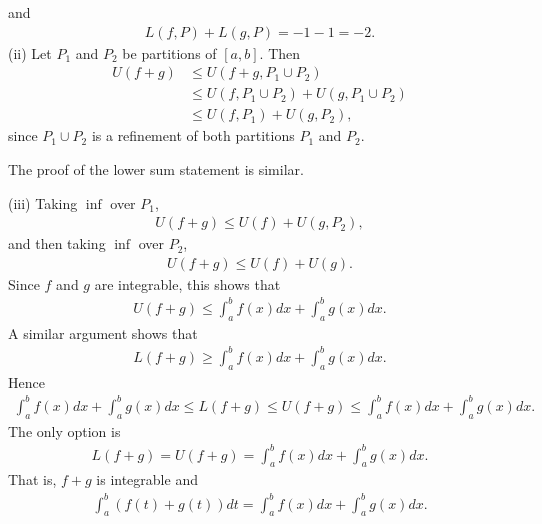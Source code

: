 \documentclass[letterpaper,10pt,english]{jupyterBook}
\begin{document}
\sphinxAtStartPar
and
\begin{equation*}
\begin{split}
L(f,P)+L(g,P) = -1 -1 =-2.
\end{split}
\end{equation*}
\sphinxAtStartPar
(ii) Let \(P_1\) and \(P_2\) be partitions of \([a,b]\). Then
\begin{align*}
U(f+g) &\leq U(f+g,P_1\cup P_2) \\
&\leq U(f,P_1\cup P_2) + U(g,P_1\cup P_2) \\
&\leq U(f,P_1) + U(g,P_2),
\end{align*}
\sphinxAtStartPar
since \(P_1\cup P_2\) is a refinement of both partitions \(P_1\) and \(P_2\).

\sphinxAtStartPar
The proof of the lower sum statement is similar.

\sphinxAtStartPar
(iii) Taking \(\inf\) over \(P_1\),
\begin{equation*}
\begin{split}
U(f+g) \leq U(f) + U(g,P_2),
\end{split}
\end{equation*}
\sphinxAtStartPar
and then taking \(\inf\) over \(P_2\),
\begin{equation*}
\begin{split}
U(f+g) \leq U(f)+U(g).
\end{split}
\end{equation*}
\sphinxAtStartPar
Since \(f\) and \(g\) are integrable, this shows that
\begin{equation*}
\begin{split}
U(f+g) \leq \int_a^bf(x)dx + \int_a^bg(x)dx.
\end{split}
\end{equation*}
\sphinxAtStartPar
A similar argument shows that
\begin{equation*}
\begin{split}
L(f+g) \geq \int_a^bf(x)dx + \int_a^bg(x)dx.
\end{split}
\end{equation*}
\sphinxAtStartPar
Hence
\begin{equation*}
\begin{split}
\int_a^bf(x)dx + \int_a^bg(x)dx \leq L(f+g) \leq U(f+g) \leq \int_a^bf(x)dx + \int_a^bg(x)dx.
\end{split}
\end{equation*}
\sphinxAtStartPar
The only option is
\begin{equation*}
\begin{split}
L(f+g)=U(f+g)=\int_a^bf(x)dx + \int_a^bg(x)dx.
\end{split}
\end{equation*}
\sphinxAtStartPar
That is, \(f+g\) is integrable and
\begin{equation*}
\begin{split}
\int_a^b(f(t)+g(t))dt = \int_a^bf(x)dx + \int_a^bg(x)dx.
\end{split}
\end{equation*}
\end{document}
